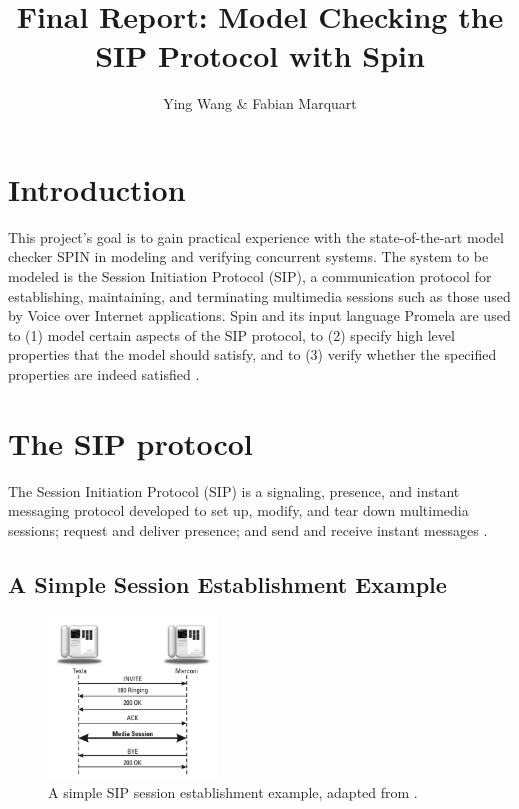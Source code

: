 \documentclass{article}
\title{Final Report: Model Checking the SIP Protocol with Spin}
\author{Ying Wang \& Fabian Marquart}
\begin{document}
\maketitle


\section{Introduction}

This project's goal is to gain practical experience with the state-of-the-art model checker SPIN in modeling and verifying concurrent systems. The system to be modeled is the Session Initiation Protocol (SIP), a communication protocol for establishing, maintaining, and terminating multimedia sessions such as those used by Voice over Internet applications. Spin and its input language Promela are used to (1) model certain aspects of the SIP protocol, to (2) specify high level properties that the model should satisfy, and to (3) verify whether the specified properties are indeed satisfied \cite{leue}.

\section{The SIP protocol}

The Session Initiation Protocol (SIP) is a signaling, presence, and instant messaging protocol developed to set up, modify, and tear down multimedia sessions; request and deliver presence; and send and receive instant messages \citep[1]{sip}.

\subsection{A Simple Session Establishment Example}

\begin{figure}[h]
\centering
\includegraphics[width=0.4\textwidth]{images/sip_simple.png}
\caption{A simple SIP session establishment example, adapted from \citep[24]{sip}.}
\label{sip_simple}
\end{figure}
\end{document}

